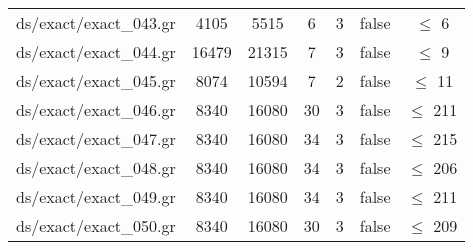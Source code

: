\documentclass{standalone}
\begin{document}
\begin{tabular}{|c|c|c|c|c|c|c|}
ds/exact/exact\_043.gr & 4105  & 5515    &  6    &  3   &  false & $\leq $ 6   \\
ds/exact/exact\_044.gr & 16479 & 21315   &  7    &  3   &  false & $\leq $ 9   \\
ds/exact/exact\_045.gr & 8074  & 10594   &  7    &  2   &  false & $\leq $ 11  \\
ds/exact/exact\_046.gr & 8340  & 16080   &  30   &  3   &  false & $\leq $ 211 \\
ds/exact/exact\_047.gr & 8340  & 16080   &  34   &  3   &  false & $\leq $ 215 \\
ds/exact/exact\_048.gr & 8340  & 16080   &  34   &  3   &  false & $\leq $ 206 \\
ds/exact/exact\_049.gr & 8340  & 16080   &  34   &  3   &  false & $\leq $ 211 \\
ds/exact/exact\_050.gr & 8340  & 16080   &  30   &  3   &  false & $\leq $ 209 \\
\end{tabular}
\end{document}
